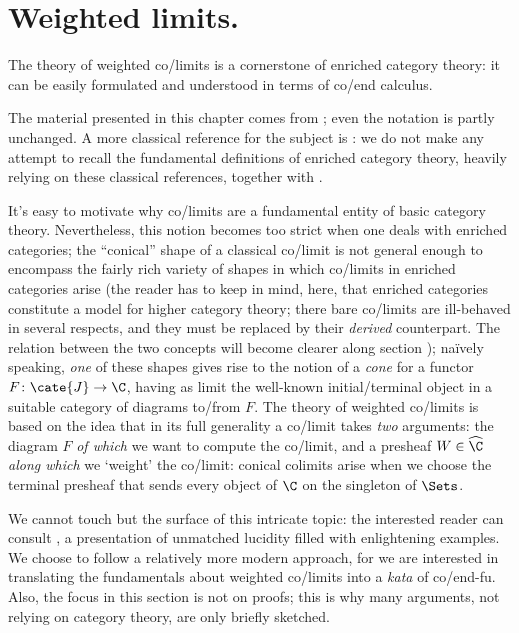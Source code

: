 \section{Weighted limits.}\label{section:weight}
The theory of weighted co/limits is a cornerstone of enriched category theory: it can be easily formulated and understood in terms of co/end calculus.

The material presented in this chapter comes from \cite[\textbf{II.7}]{riehl2014categorical}; even the notation is partly unchanged. A more classical reference for the subject is \cite{kelly1982basic,kelly1974review}: we do not make any attempt to recall the fundamental definitions of enriched category theory, heavily relying on these classical references, together with \cite{Bor2}.

It's easy to motivate why co/limits are a fundamental entity of basic category theory. Nevertheless, this notion becomes too strict when one deals with enriched categories; the ``conical'' shape of a classical co/limit is not general enough to encompass the fairly rich variety of shapes in which co/limits in enriched categories arise (the reader has to keep in mind, here, that enriched categories constitute a model for higher category theory; there bare co/limits are ill\hyp{}behaved in several respects, and they must be replaced by their \emph{derived} counterpart. The relation between the two concepts will become clearer along section ); na\"ively speaking, \emph{one} of these shapes gives rise to the notion of a \emph{cone} for a functor $F\colon \cate{J}\to \C$, having as limit the well-known initial/terminal object in a suitable category of diagrams to/from $F$. The theory of weighted co/limits is based on the idea that in its full generality a co/limit takes \emph{two} arguments: the diagram $F$ \emph{of which} we want to compute the co/limit, and a presheaf $W \in\widehat{\C}$ \emph{along which} we `weight' the co/limit: conical colimits arise when we choose the terminal presheaf that sends every object of $\C$ on the singleton of $\Sets$.

We cannot touch but the surface of this intricate topic: the interested reader can consult \cite{2catlimits}, a presentation of unmatched lucidity filled with enlightening examples. We choose to follow a relatively more modern approach, for we are interested in translating the fundamentals about weighted co/limits into a \emph{kata} of co/end-fu. Also, the focus in this section is not on proofs; this is why many arguments, not relying on category theory, are only briefly sketched.  %
